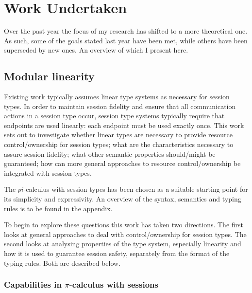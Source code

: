 \section{Work Undertaken}
\label{Research}
%

Over the past year the focus of my research has shifted to a more theoretical one. As such, some of the goals stated last year have been met, while others have been superseded by new ones. An overview of which I present here.

\subsection{Modular linearity}
\label{sub:modlinearity}
Existing work typically assumes linear type systems as necessary for session types. In order to maintain session fidelity and ensure that all communication actions in a session type occur, session type systems typically require that endpoints are used linearly: each endpoint must be used exactly once.
This work sets out to investigate whether linear types are necessary to provide resource control/ownership for session types; what are the characteristics necessary to assure session fidelity; what other semantic properties should/might be guaranteed; how can more general approaches to resource control/ownership be integrated with session types.

The $pi$-calculus with session types has been chosen as a suitable starting point for its simplicity and expressivity. An overview of the syntax, semantics and typing rules is to be found in the appendix.


To begin to explore these questions this work has taken two directions. The first looks at general approaches to deal with control/ownership for session types. The second looks at analysing properties of the type system, especially linearity and how it is used to guarantee session safety, separately from the format of the typing rules. Both are described below.

\subsubsection{Capabilities in $\pi$-calculus with sessions}



